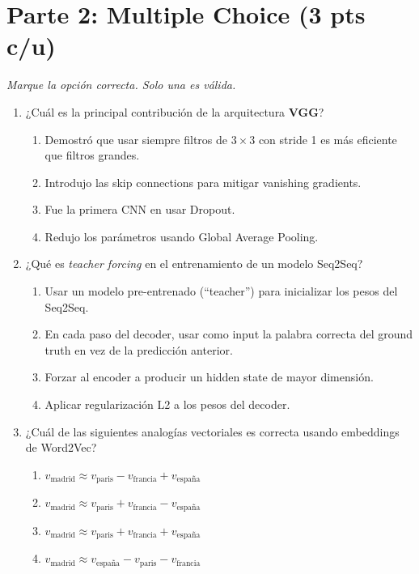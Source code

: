 \documentclass[12pt,a4paper]{article}
\begin{document}
\section*{Parte 2: Multiple Choice (3 pts c/u)}
\textit{Marque la opción correcta. Solo una es válida.}

\begin{enumerate}[label=\arabic*)]
    \item ¿Cuál es la principal contribución de la arquitectura \textbf{VGG}?
    \begin{enumerate}[label=\Alph*)]
        \item Demostró que usar siempre filtros de $3 \times 3$ con stride 1 es más eficiente que filtros grandes.
        \item Introdujo las skip connections para mitigar vanishing gradients.
        \item Fue la primera CNN en usar Dropout.
        \item Redujo los parámetros usando Global Average Pooling.
    \end{enumerate}

    \item ¿Qué es \textit{teacher forcing} en el entrenamiento de un modelo Seq2Seq?
    \begin{enumerate}[label=\Alph*)]
        \item Usar un modelo pre-entrenado (``teacher'') para inicializar los pesos del Seq2Seq.
        \item En cada paso del decoder, usar como input la palabra correcta del ground truth en vez de la predicción anterior.
        \item Forzar al encoder a producir un hidden state de mayor dimensión.
        \item Aplicar regularización L2 a los pesos del decoder.
    \end{enumerate}

    \item ¿Cuál de las siguientes analogías vectoriales es correcta usando embeddings de Word2Vec?
    \begin{enumerate}[label=\Alph*)]
        \item $v_{\text{madrid}} \approx v_{\text{paris}} - v_{\text{francia}} + v_{\text{españa}}$
        \item $v_{\text{madrid}} \approx v_{\text{paris}} + v_{\text{francia}} - v_{\text{españa}}$
        \item $v_{\text{madrid}} \approx v_{\text{paris}} + v_{\text{francia}} + v_{\text{españa}}$
        \item $v_{\text{madrid}} \approx v_{\text{españa}} - v_{\text{paris}} - v_{\text{francia}}$
    \end{enumerate}


\end{enumerate}
\end{document}
